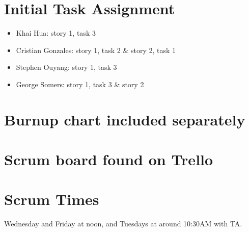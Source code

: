 \documentclass[11pt]{article}
\begin{document}
	\section{Initial Task Assignment}
	    \vspace{-3mm}
	    \begin{itemize}
		    \item Khai Hua: story 1, task 3
		    \item Cristian Gonzales: story 1, task 2 \& story 2, task 1
		    \item Stephen Ouyang: story 1, task 3
		    \item George Somers: story 1, task 3 \& story 2
		\end{itemize}
	\section{Burnup chart included separately}
	\section{Scrum board found on Trello}
	\section{Scrum Times}
	    Wednesday and Friday at noon, and Tuesdays at around 10:30AM with TA.
\end{document}

